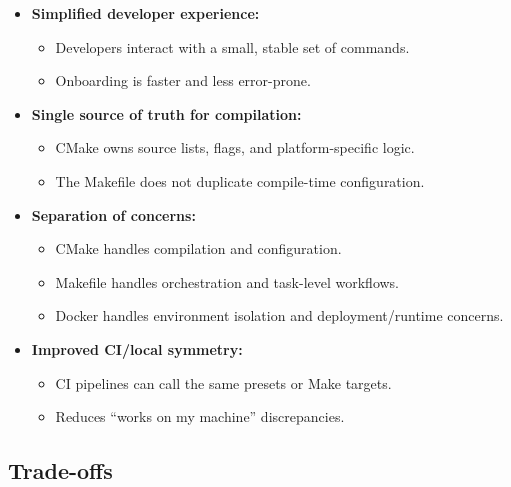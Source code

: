 \documentclass[11pt]{article}
\begin{document}
\begin{itemize}[noitemsep]
  \item \textbf{Simplified developer experience:}
    \begin{itemize}[noitemsep]
      \item Developers interact with a small, stable set of commands.
      \item Onboarding is faster and less error-prone.
    \end{itemize}
  \item \textbf{Single source of truth for compilation:}
    \begin{itemize}[noitemsep]
      \item CMake owns source lists, flags, and platform-specific logic.
      \item The Makefile does not duplicate compile-time configuration.
    \end{itemize}
  \item \textbf{Separation of concerns:}
    \begin{itemize}[noitemsep]
      \item CMake handles compilation and configuration.
      \item Makefile handles orchestration and task-level workflows.
      \item Docker handles environment isolation and deployment/runtime concerns.
    \end{itemize}
  \item \textbf{Improved CI/local symmetry:}
    \begin{itemize}[noitemsep]
      \item CI pipelines can call the same presets or Make targets.
      \item Reduces ``works on my machine'' discrepancies.
    \end{itemize}
\end{itemize}

\subsection*{Trade-offs}
\end{document}

